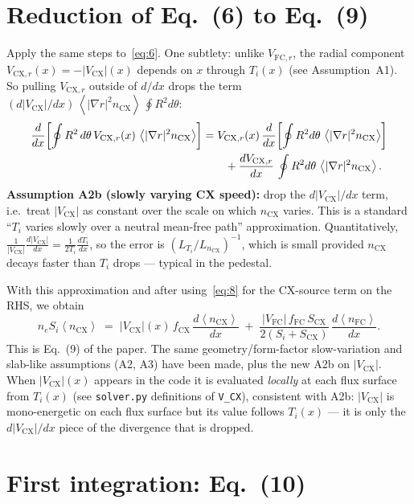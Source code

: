 \documentclass[11pt]{article}
\renewcommand{\ne}{n_{e}}  %
\newcommand{\nfc}{n_{\mathrm{FC}}}
\newcommand{\ncx}{n_{\mathrm{CX}}}
\newcommand{\Vfc}{\lvert V_{\mathrm{FC}}\rvert}
\newcommand{\Vcx}{\lvert V_{\mathrm{CX}}\rvert}
\newcommand{\Vfcr}{V_{\mathrm{FC},r}}
\newcommand{\Vcxr}{V_{\mathrm{CX},r}}
\newcommand{\Si}{S_{i}}
\newcommand{\Scx}{S_{\mathrm{CX}}}
\newcommand{\fFC}{f_{\mathrm{FC}}}
\newcommand{\fCX}{f_{\mathrm{CX}}}
\newcommand{\fsa}[1]{\left\langle #1 \right\rangle}
\begin{document}
\section{Reduction of Eq.~(6) to Eq.~(9)}
\label{sec:eq-9}

Apply the same steps to~\eqref{eq:6}.  One subtlety: unlike $\Vfcr$, the
radial component $\Vcxr(x) = -\Vcx(x)$ depends on $x$ through
$T_i(x)$ (see Assumption~A1).  So pulling $\Vcxr$ outside of $d/dx$
drops the term $(d\Vcx/dx)\,\fsa{|\nabla r|^{2}\ncx}\,\oint R^{2}d\theta$:
\begin{align}
  \frac{d}{dx}\!\left[\oint R^{2}\,d\theta\,\Vcxr(x)\,\fsa{|\nabla r|^{2}\ncx}\right]
  &= \Vcxr(x)\,\frac{d}{dx}\!\left[\oint R^{2}d\theta\,\fsa{|\nabla r|^{2}\ncx}\right] \notag\\
  &\qquad + \frac{d\Vcxr}{dx}\,\oint R^{2}d\theta\,\fsa{|\nabla r|^{2}\ncx}.
\end{align}
\textbf{Assumption A2b (slowly varying CX speed):} drop the
$d\Vcx/dx$ term, i.e.\ treat $\Vcx$ as constant over the scale on which
$\ncx$ varies.  This is a standard ``$T_i$ varies slowly over a neutral
mean-free path'' approximation.  Quantitatively,
$\tfrac{1}{\Vcx}\tfrac{d\Vcx}{dx}=\tfrac{1}{2T_i}\tfrac{dT_i}{dx}$, so the
error is $(L_{T_i}/L_{n_{\mathrm{CX}}})^{-1}$, which is small provided
$\ncx$ decays faster than $T_i$ drops --- typical in the pedestal.

With this approximation and after using~\eqref{eq:8} for the CX-source
term on the RHS, we obtain
\begin{equation}
  \ne\Si\fsa{\ncx} \;=\; \Vcx(x)\,\fCX\,\frac{d\fsa{\ncx}}{dx}
    \;+\; \frac{\Vfc\,\fFC\,\Scx}{2(\Si+\Scx)}\,\frac{d\fsa{\nfc}}{dx}.
  \label{eq:9}
\end{equation}
This is Eq.~(9) of the paper.  The same geometry/form-factor slow-variation
and slab-like assumptions (A2, A3) have been made, plus the new A2b on
$\Vcx$.  When $\Vcx(x)$ appears in the code it is evaluated
\emph{locally} at each flux surface from $T_i(x)$ (see
\texttt{solver.py} definitions of \texttt{V\_CX}), consistent with A2b:
$\Vcx$ is mono-energetic on each flux surface but its value follows
$T_i(x)$ --- it is only the $d\Vcx/dx$ piece of the divergence that is
dropped.

\section{First integration: Eq.~(10)}
\label{sec:eq-10}
\end{document}
